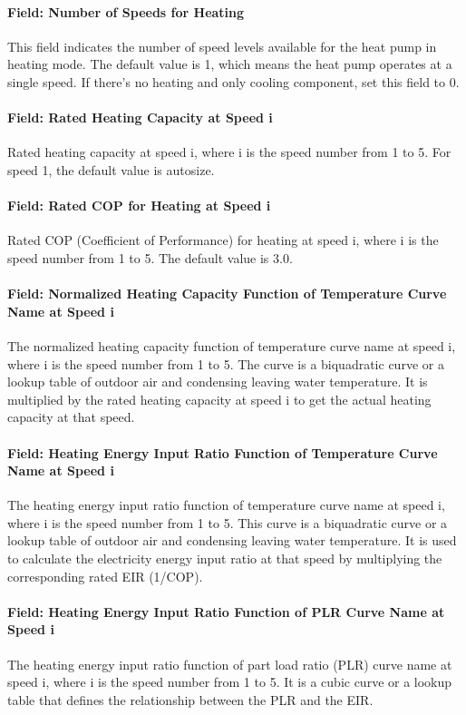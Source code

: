 \paragraph{Field: Number of Speeds for Heating} This field indicates the number
of speed levels available for the heat pump in heating mode. The default value
is 1, which means the heat pump operates at a single speed. If there's no
heating and only cooling component, set this field to 0.
\paragraph{Field: Rated Heating Capacity at Speed i} Rated heating capacity at
speed i, where i is the speed number from 1 to 5. For speed 1, the default value
is autosize.
\paragraph{Field: Rated COP for Heating at Speed i} Rated COP (Coefficient of
Performance) for heating at speed i, where i is the speed number from 1 to 5.
The default value is 3.0.
\paragraph{Field: Normalized Heating Capacity Function of Temperature Curve Name
at Speed i} The normalized heating capacity function of temperature curve name
at speed i, where i is the speed number from 1 to 5. The curve is a biquadratic
curve or a lookup table of outdoor air and condensing leaving water temperature.
It is multiplied by the rated heating capacity at speed i to get the actual
heating capacity at that speed.
\paragraph{Field: Heating Energy Input Ratio Function of Temperature Curve Name
at Speed i} The heating energy input ratio function of temperature curve name at
speed i, where i is the speed number from 1 to 5. This curve is a biquadratic
curve or a lookup table of outdoor air and condensing leaving water temperature.
It is used to calculate the electricity energy input ratio at that speed by
multiplying the corresponding rated EIR (1/COP).
\paragraph{Field: Heating Energy Input Ratio Function of PLR Curve Name at Speed
i} The heating energy input ratio function of part load ratio (PLR) curve name
at speed i, where i is the speed number from 1 to 5. It is a cubic curve or a
lookup table that defines the relationship between the PLR and the EIR.
